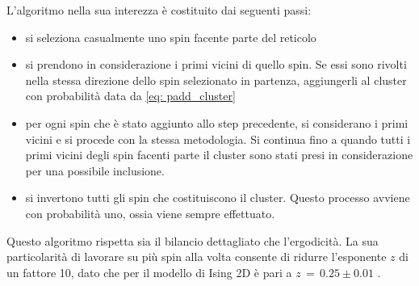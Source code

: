 L'algoritmo nella sua interezza è costituito dai seguenti passi:

\begin{itemize}[label=$\diamond$] 
    \item si seleziona casualmente uno spin facente parte del reticolo
    \item si prendono in considerazione i primi vicini di quello spin. Se essi sono rivolti nella stessa direzione dello spin 
    selezionato in partenza, aggiungerli al cluster con probabilità data da \eqref{eq: padd_cluster}
    \item per ogni spin che è stato aggiunto allo step precedente, si considerano i primi vicini e si procede con la stessa metodologia. 
    Si continua fino a quando tutti i primi vicini degli spin facenti parte il cluster sono stati presi in considerazione per una possibile 
    inclusione.
    \item si invertono tutti gli spin che costituiscono il cluster. Questo processo avviene con probabilità uno, ossia viene sempre effettuato.
\end{itemize}

Questo algoritmo rispetta sia il bilancio dettagliato che l'ergodicità. La sua particolarità di lavorare su più spin alla volta consente di 
ridurre l'esponente $z$ di un fattore 10, dato che per il modello di Ising 2D è pari a $z\,=\,0.25 \pm 0.01$ \cite{MCM}.


